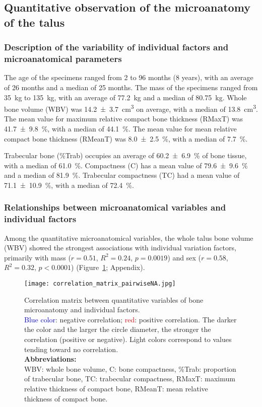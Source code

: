 \documentclass[12pt,a4paper]{article}
\begin{document}
\subsection{Quantitative observation of the microanatomy of the talus}
\subsubsection{Description of the variability of individual factors and microanatomical parameters}
The age of the specimens ranged from 2 to 96 months (8 years), with an average of 26 months and a median of 25 months. The mass of the specimens ranged from \SI{35}{\kilo\gram} to \SI{135}{\kilo\gram}, with an average of \SI{77.2}{\kilo\gram} and a median of \SI{80.75}{\kilo\gram}. Whole bone volume (WBV) was \SI{14.2 \pm 3.7}{\centi\meter\cubed} on average, with a median of \SI{13.8}{\centi\meter\cubed}. The mean value for maximum relative compact bone thickness (RMaxT) was \SI{41.7 \pm 9.8}{\percent}, with a median of \SI{44.1}{\percent}. The mean value for mean relative compact bone thickness (RMeanT) was \SI{8.0 \pm 2.5}{\percent}, with a median of \SI{7.7}{\percent}. 

Trabecular bone (\%Trab) occupies an average of \SI{60.2 \pm 6.9}{\percent} of bone tissue, with a median of \SI{61.0}{\percent}. Compactness (C) has a mean value of \SI{79.6 \pm 9.6}{\percent} and a median of \SI{81.9}{\percent}. Trabecular compactness (TC) had a mean value of \SI{71.1 \pm 10.9}{\percent}, with a median of \SI{72.4}{\percent}.
\subsubsection{Relationships between microanatomical variables and individual factors}
Among the quantitative microanatomical variables, the whole talus bone volume (WBV) showed the strongest associations with individual variation factors, primarily with mass ($r = 0.51$, $R^2 = 0.24$, $p = 0.0019$) and sex ($r = 0.58$, $R^2 = 0.32$, $p < 0.0001$) (Figure~\ref{correlation_matrix}; Appendix). 

\begin{figure}[H]
	\texttt{[image: correlation\_matrix\_pairwiseNA.jpg]}
	\caption{Correlation matrix between quantitative variables of bone microanatomy and individual factors.\\
\textcolor{blue}{Blue color}: negative correlation; \textcolor{red}{red}: positive correlation. The darker the color and the larger the circle diameter, the stronger the correlation (positive or negative). Light colors correspond to values tending toward no correlation. \\
\textbf{Abbreviations:} \\
WBV: whole bone volume, C: bone compactness, \%Trab: proportion of trabecular bone, TC: trabecular compactness, RMaxT: maximum relative thickness of compact bone, RMeanT: mean relative thickness of compact bone. \\}
	\label{correlation_matrix}
\end{figure}
\end{document}
